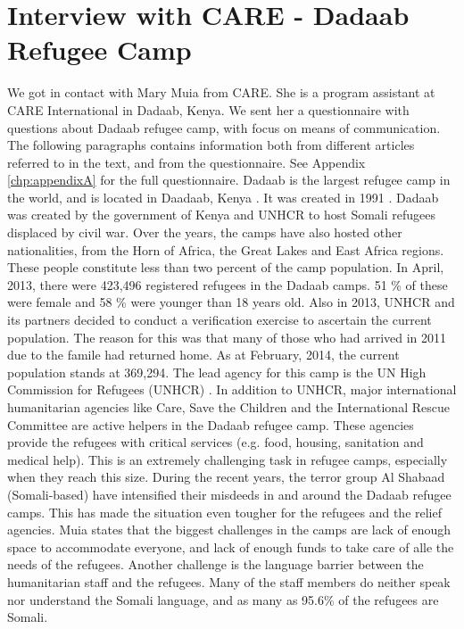 \section{Interview with CARE - Dadaab Refugee Camp}
We got in contact with Mary Muia from CARE. She is a program assistant at CARE International in Dadaab, Kenya. We sent her a questionnaire with questions about Dadaab refugee camp, with focus on means of communication. The following paragraphs contains information both from different articles referred to in the text, and from the questionnaire. See Appendix \ref{chp:appendixA} for the full questionnaire. Dadaab is the largest refugee camp in the world, and is located in Daadaab, Kenya \cite{dadaab}. It was created in 1991 \cite{dadaabcare}. Dadaab was created by the government of Kenya and UNHCR to host Somali refugees displaced by civil war. Over the years, the camps have also hosted other nationalities, from the Horn of Africa, the Great Lakes and East Africa regions. These people constitute less than two percent of the camp population. In April, 2013, there were 423,496 registered refugees in the Dadaab camps. 51 \% of these were female and 58 \% were younger than 18 years old. Also in 2013, UNHCR and its partners decided to conduct a verification exercise to ascertain the current population. The reason for this was that many of those who had arrived in 2011 due to the famile had returned home. As at February, 2014, the current population stands at 369,294. The lead agency for this camp is the UN High Commission for Refugees (UNHCR) \cite{dadaab}. In addition to UNHCR, major international humanitarian agencies like Care, Save the Children and the International Rescue Committee  are active helpers in the Dadaab refugee camp. These agencies provide the refugees with critical services (e.g. food, housing, sanitation and medical help). This is an extremely challenging task in refugee camps, especially when they reach this size. During the recent years, the terror group Al Shabaad (Somali-based) have intensified their misdeeds in and around the Dadaab refugee camps. This has made the situation even tougher for the refugees and the relief agencies. 
Muia states that the biggest challenges in the camps are lack of enough space to accommodate everyone, and lack of enough funds to take care of alle the needs of the refugees. Another challenge is the language barrier between the humanitarian staff and the refugees. Many of the staff members do neither speak nor understand the Somali language, and as many as 95.6\% of the refugees are Somali. 


